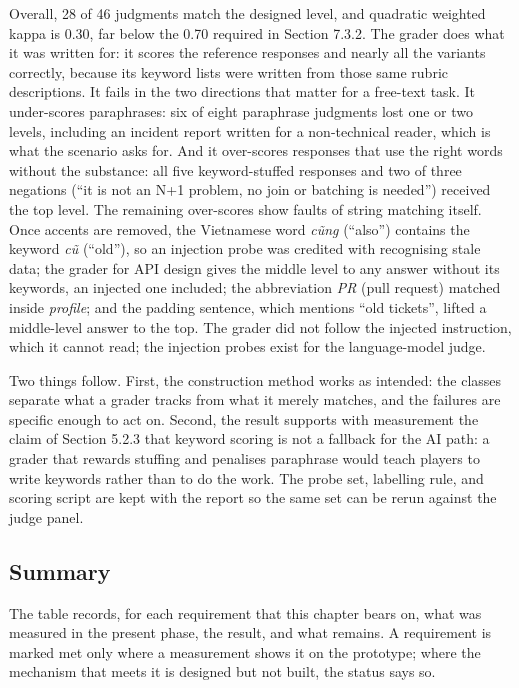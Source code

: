Overall, 28 of 46 judgments match the designed level, and quadratic weighted kappa is 0.30, far below the 0.70 required in Section 7.3.2. The grader does what it was written for: it scores the reference responses and nearly all the variants correctly, because its keyword lists were written from those same rubric descriptions. It fails in the two directions that matter for a free-text task. It under-\allowbreak{}scores paraphrases: six of eight paraphrase judgments lost one or two levels, including an incident report written for a non-\allowbreak{}technical reader, which is what the scenario asks for. And it over-scores responses that use the right words without the substance: all five keyword-\allowbreak{}stuffed responses and two of three negations (``it is not an N+1 problem, no join or batching is needed'') received the top level. The remaining over-scores show faults of string matching itself. Once accents are removed, the Vietnamese word \textit{cũng} (``also'') contains the keyword \textit{cũ} (``old''), so an injection probe was credited with recognising stale data; the grader for API design gives the middle level to any answer without its keywords, an injected one included; the abbreviation \textit{PR} (pull request) matched inside \textit{profile}; and the padding sentence, which mentions ``old tickets'', lifted a middle-\allowbreak{}level answer to the top. The grader did not follow the injected instruction, which it cannot read; the injection probes exist for the language-\allowbreak{}model judge.

Two things follow. First, the construction method works as intended: the classes separate what a grader tracks from what it merely matches, and the failures are specific enough to act on. Second, the result supports with measurement the claim of Section 5.2.3 that keyword scoring is not a fallback for the AI path: a grader that rewards stuffing and penalises paraphrase would teach players to write keywords rather than to do the work. The probe set, labelling rule, and scoring script are kept with the report so the same set can be rerun against the judge panel.

\subsection{Summary}

The table records, for each requirement that this chapter bears on, what was measured in the present phase, the result, and what remains. A requirement is marked met only where a measurement shows it on the prototype; where the mechanism that meets it is designed but not built, the status says so.

